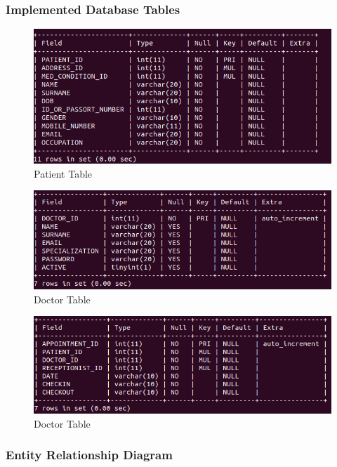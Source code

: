 \documentclass[12pt]{article}
\begin{document}
    \subsubsection{Implemented Database Tables}
    \begin{figure}[h]
    \centering
    
    \includegraphics[width=\linewidth]{PATIENT_TABLE.png}
    \caption{Patient Table}
    \end{figure}
    \begin{figure}[h]
    \centering
    
    \includegraphics[width=\linewidth]{DOCTOR_TABLE.png}
    \caption{Doctor Table}
    \end{figure}
    
    \begin{figure}[h]
    \centering
    
    \includegraphics[width=\linewidth]{APPOINTMENT_TABLE.png}
    \caption{Doctor Table}
    \end{figure}
    
    \subsubsection{Entity Relationship Diagram}
\end{document}
